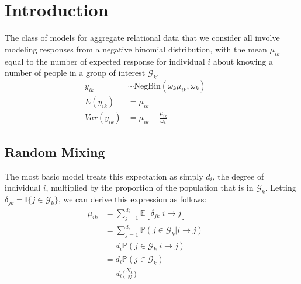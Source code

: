 \documentclass[12pt]{article}
\begin{document}

\def\ci{\perp\!\!\!\perp}
\def\ex{\mathbb{E}}
\def\prob{\mathbb{P}}
\def\ind{\mathbb{I}}
\def\grad{\triangledown}
\def\bigo{\mathcal{O}}
\def\normal{\mathcal{N}}
\def\lognormal{\log\normal}

\section{Introduction}
The class of models for aggregate relational data that we consider all involve modeling responses from a negative binomial distribution, with the mean $\mu_{ik}$ equal to the number of expected response for individual $i$ about knowing a number of people in a group of interest $\mathcal{G}_k$.
\begin{align}
y_{ik} &\sim \text{NegBin}(\omega_k \mu_{ik}, \omega_k) && \\\nonumber
E(y_{ik}) &= \mu_{ik} \\\nonumber
Var(y_{ik}) &= \mu_{ik} + \frac{\mu_{ik}}{\omega_k}
\end{align}

\subsection{Random Mixing}
\noindent The most basic model treats this expectation as simply $d_i$, the degree of individual $i$, multiplied by the proportion of the population that is in $\mathcal{G}_k$. Letting $\delta_{jk} = \ind\{ j \in \mathcal{G}_k\}$, we can derive this expression as follows:
\begin{align}
\mu_{ik} 
&= \sum_{j=1}^{d_i} \ex[ \delta_{jk} | i \to j ] && \\\nonumber
&= \sum_{j=1}^{d_i} \prob( j \in \mathcal{G}_k | i \to j ) && \\\nonumber
&= d_i \prob( j \in \mathcal{G}_k | i \to j ) && \\\nonumber
&= d_i \prob( j \in \mathcal{G}_k) && \\\nonumber
&= d_i \biggl( \frac{N_k}{N} \biggr)
\end{align}

\pagebreak
\end{document}
